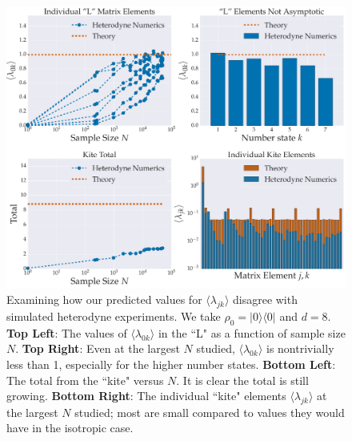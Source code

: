 \documentclass[aps,pra, twocolumn]{revtex4-1}
\begin{document}
\begin{figure}[h]
  \includegraphics[width=\columnwidth]{Images/Figure_10.pdf}
 \caption{Examining how our predicted values for $\langle \lambda_{jk} \rangle$ disagree with simulated heterodyne experiments. We take $\rho_{0} = |0\rangle\langle 0|$ and $d=8$. \textbf{Top Left}: The values of  $\langle \lambda_{0k}\rangle$ in the ``L" as a function of sample size $N$.  \textbf{Top Right}:  Even at the largest $N$ studied, $\langle \lambda_{0k}\rangle$ is nontrivially less than 1, especially for the higher number states. \textbf{Bottom Left}: The total from the ``kite" versus $N$. It is clear the total is still growing. \textbf{Bottom Right}: The individual ``kite" elements $\langle \lambda_{jk}\rangle$ at the largest $N$ studied;  most are small compared to values they would have in the isotropic case.}
\label{fig:individcontrib}
\end{figure}
\end{document}
